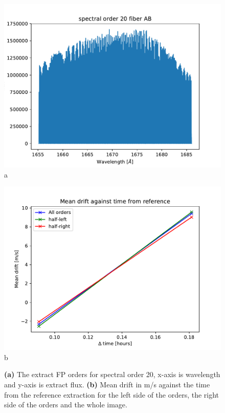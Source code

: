 \begin{figure}

\begin{center}
\begin{minipage}{.495\textwidth}
\begin{center}
\includegraphics[width=\textwidth]{Figures/cal_driftpeak_e2ds_1.pdf}
a
\end{center}
\end{minipage}%
\begin{minipage}{.495\textwidth}
\begin{center}
\includegraphics[width=\textwidth]{Figures/cal_driftpeak_e2ds_2.pdf}
b
\end{center}
\end{minipage}%
\end{center}

\caption{\textbf{(a)} The extract FP orders for spectral order 20, x-axis is wavelength and y-axis is extract flux.  \textbf{(b)} Mean drift in m/s against the time from the reference extraction for the left side of the orders, the right side of the orders and the whole image. \label{figure:cal_driftpeak_e2ds}}
\end{figure}

